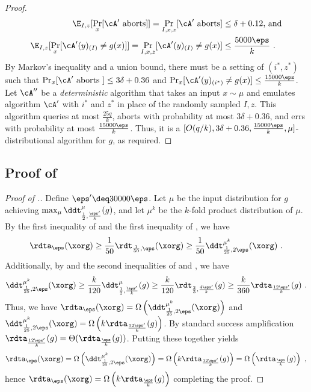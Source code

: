 \documentclass{toc}
\begin{document}
\begin{proof}
%
%
%
\begin{align*}
  \E_{I,z}[\Pr_x[\cA' \text{ aborts}]] = \Pr_{I,x,z}[\cA' \text{ aborts}] &\leq \delta + 0.12 \text{, and}\\
  \E_{I,z}[\Pr_x[\cA'(y)_{(I)} \neq g(x)]] = \Pr_{I,x,z}[\cA'(y)_{(I)} \neq g(x)] &\leq \frac{5000\eps}{k}\ .
\end{align*}
By Markov's inequality and a union bound, there must be a setting of
$(i^*,z^*)$ such that
$\Pr_x[\cA' \text{ aborts }] \leq 3\delta + 0.36$ and
$\Pr_x[\cA'(y)_{(i^*)} \neq g(x)] \leq \frac{15000\eps}{k}$.  Let
$\cA''$ be a \emph{deterministic} algorithm that takes an input
$x \sim \mu$ and emulates algorithm $\cA'$ with $i^*$ and $z^*$ in
place of the randomly sampled $I,z$. This algorithm queries at most
$\frac{25q}{k}$, aborts with probability at most $3 \delta + 0.36$,
and errs with probability at most $\frac{15000\eps}{k}$.  Thus, it is
a $[O(q/k), 3\delta+0.36, \frac{15000\eps}{k}, \mu]$-distributional
algorithm for $g$, as required.
\end{proof}

    
\subsection{Proof of }
\begin{proof}[Proof of .]
  Define $\eps' \deq 30000\eps$.  Let $\mu$ be the input distribution
  for $g$ achieving
  $\max_\mu \ddt_{\frac{1}{2}, \frac{\eps'}{k}}^\mu(g)$, and let $\mu^k$
  be the $k$-fold product distribution of $\mu$.
  By the first inequality of  and the
  first inequality of , we
  have
  $$\rdta_\eps(\xorg) \geq \frac{1}{50}\rdt_{\frac{1}{50},\eps}(\xorg) \geq \frac{1}{50}\ddt_{\frac{1}{25}, 2\eps}^{\mu^k}(\xorg)\ .$$
  Additionally, by  and the second
  inequalities of 
  and , we have
  $$\ddt_{\frac{1}{25}, 2\eps}^{\mu^k}(\xorg) \geq \frac{k}{120} \ddt_{\frac{1}{2},\frac{\eps'}{k}}^\mu(g) \geq \frac{k}{120}\rdt_{\frac{2}{3},\frac{4\eps'}{k}}(g) \geq \frac{k}{360}\rdta_{\frac{12\eps'}{k}}(g) \ .$$
  Thus, we have
  $\rdta_\eps(\xorg) =
  \Omega\left(\ddt_{\frac{1}{25},2\eps}^{\mu^k}(\xorg)\right)$ and
  $\ddt_{\frac{1}{25},2\eps}^{\mu^k}(\xorg) =
  \Omega\left(k\rdta_{\frac{12\eps'}{k}}(g)\right)$.  By standard
  success amplification
  $\rdta_{\frac{12\eps'}{k}}(g) = \Theta(\rdta_{\frac{\eps}{k}}(g))$.
  Putting these together yields
  $$\rdta_\eps(\xorg) =
  \Omega\left(\ddt_{\frac{1}{25},2\eps}^{\mu^k}(\xorg)\right) =
  \Omega\left(k\rdta_{\frac{12\eps'}{k}}(g)\right) =
  \Omega\left(\rdta_{\frac{\eps}{k}}(g)\right)\ ,$$ hence
  $\rdta_\eps(\xorg) = \Omega\left(k\rdta_{\frac{\eps}{k}}(g)\right)$ completing the proof.
\end{proof}
\end{document}
